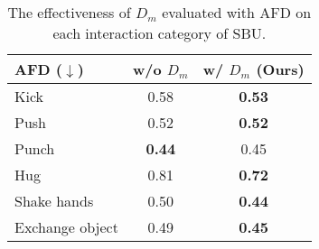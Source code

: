 \documentclass[times,twocolumn,final]{elsarticle}
\begin{document}
\begin{table}
\small
\centering
\caption{The effectiveness of $D_m$ evaluated with AFD on each interaction category of SBU.}
\label{tab:afd_dm}
\begin{tabular}{|l|c|c|}
\hline
AFD ($\downarrow$)            & w/o $D_m$ & w/ $D_m$ (Ours) \\ \hline
Kick            & 0.58   & \textbf{0.53}         \\ 
Push            & 0.52   & \textbf{0.52}         \\ 
Punch           & \textbf{0.44}   & 0.45         \\ 
Hug             & 0.81   & \textbf{0.72}         \\ 
Shake hands     & 0.50   & \textbf{0.44}         \\ 
Exchange object & 0.49   & \textbf{0.45}         \\ \hline
\end{tabular}
\end{table}


\begin{table}
\centering
\caption{\textcolor{black}{The effectiveness of the proposed reactive synthesis method over existing models evaluated with AFD on each interaction category of SBU.}}
\label{tab:afd}
\end{table}
\end{document}
